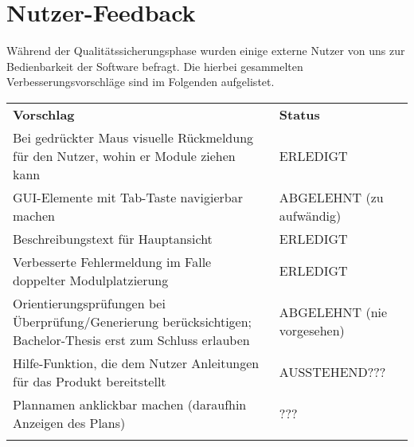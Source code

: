 \FloatBarrier
\section{Nutzer-Feedback}

Während der Qualitätssicherungsphase wurden einige externe Nutzer von uns zur Bedienbarkeit der Software befragt. Die hierbei gesammelten Verbesserungsvorschläge sind im Folgenden aufgelistet.

\begin{longtable}{| >{\hspace{0pt}} p{} | >{\hspace{0pt}} p{} | }
	\hline
	\textbf{Vorschlag} & \textbf{Status} \\ 
	\hhline{|=|=|}
	\endfirsthead
	\endhead
	Bei gedrückter Maus visuelle Rückmeldung für den Nutzer, wohin er Module ziehen kann 
	& ERLEDIGT \\
	\hline
	GUI-Elemente mit Tab-Taste navigierbar machen 
	& ABGELEHNT (zu aufwändig) \\
	\hline 
	Beschreibungstext für Hauptansicht 
	& ERLEDIGT \\
	\hline
	Verbesserte Fehlermeldung im Falle doppelter Modulplatzierung
	& ERLEDIGT \\
	\hline
	Orientierungsprüfungen bei Überprüfung/Generierung berücksichtigen; Bachelor-Thesis erst zum Schluss erlauben
	& ABGELEHNT (nie vorgesehen) \\
	\hline
	Hilfe-Funktion, die dem Nutzer Anleitungen für das Produkt bereitstellt
	& AUSSTEHEND??? \\
	\hline
	Plannamen anklickbar machen (daraufhin Anzeigen des Plans)
	& ??? \\
	\hhline{|=|=|}
\end{longtable}